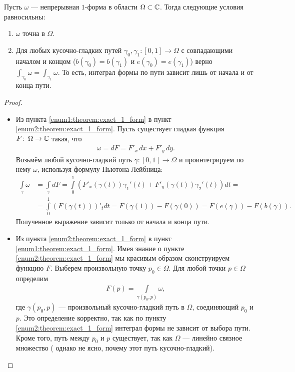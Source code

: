 \documentclass[../complex-analysis.tex]{subfiles}
\begin{document}
\begin{thm}
 \label{theorem:exact_1_form}
 Пусть $\omega$ --- непрерывная $1$-форма в области $\Omega \subset \mathbb{C}$. Тогда следующие условия равносильны:
 \begin{enumerate}
  \item \label{enum1:theorem:exact_1_form} $\omega$ точна в $\Omega$.
  \item \label{enum2:theorem:exact_1_form} Для любых кусочно-гладких путей $\gamma_0, \gamma_1 \colon [0,1] \to \Omega$ с совпадающими началом и концом ($b(\gamma_0) = b(\gamma_1)$ и $e(\gamma_0) = e(\gamma_1)$) верно $ \int_{\gamma_0}  \omega = \int_{\gamma_1} \omega $. То есть, интеграл формы по пути зависит лишь от начала и от конца пути.
 \end{enumerate}
\end{thm}
\begin{proof}\
 \begin{itemize}
  \item Из пункта \ref{enum1:theorem:exact_1_form} в пункт \ref{enum2:theorem:exact_1_form}. Пусть существует гладкая функция $F \colon\,\Omega \to \mathbb{C}$ такая, что
   \begin{align*}
    \omega = d F = F'_x \, dx + F'_y \, dy
   .\end{align*} Возьмём любой кусочно-гладкий путь $\gamma \colon [0,1] \to \Omega$ и проинтегрируем по нему $\omega$, используя формулу Ньютона-Лейбница:
   \begin{align*}
    \int\limits_{\gamma} \omega &= \int\limits_{\gamma} dF = \int\limits_{0}^{1} \left( F'_x(\gamma(t)) \gamma_1'(t)  + F'_y(\gamma(t)) \gamma_2'(t) \right) dt = \\
    &= \int\limits_{0}^{1} \left( F(\gamma(t)) \right)'_t dt = F(\gamma(1)) - F(\gamma(0)) = F(e(\gamma)) - F(b(\gamma))
   .\end{align*} Полученное выражение зависит только от начала и конца пути.
  \item Из пункта \ref{enum2:theorem:exact_1_form} в пункт \ref{enum1:theorem:exact_1_form}. Имея знание о пункте \ref{enum2:theorem:exact_1_form} мы красивым образом сконструируем функцию $F$. Выберем произвольную точку $p_0 \in \Omega$. Для любой точки $p \in \Omega$ определим
   \begin{align*}
    F(p) = \int\limits_{\gamma(p_0,p)}  \omega
   ,\end{align*} где $\gamma(p_0,p)$ --- произвольный кусочно-гладкий путь в  $\Omega$, соединяющий $p_0$ и $p$. Это определение корректно, так как по пункту \ref{enum2:theorem:exact_1_form} интеграл формы не зависит от выбора пути. Кроме того, путь между $p_0$ и $p$ существует, так как $\Omega$ --- линейно связное множество ({\color{red} однако не ясно, почему этот путь кусочно-гладкий}).


\end{itemize}
\end{proof}
\end{document}
